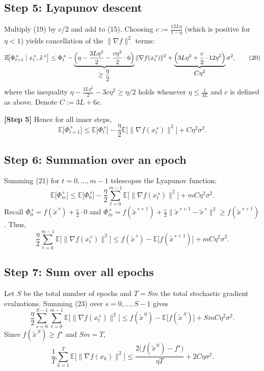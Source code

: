 \documentclass{article}
\newcommand{\EE}{\mathbb{E}}
\begin{document}
\subsection*{Step 5: Lyapunov descent}
Multiply (19) by $c/2$ and add to (15).  Choosing $c:=\frac{12L\eta}{1-\eta}$ (which is positive for $\eta<1$) yields cancellation of the $\|\nabla f\|^{2}$ terms:
\[
\EE\!\bigl[\Phi_{t+1}^{\,s}\mid x_{t}^{\,s},\tilde{x}^{\,s}\bigr]
\le \Phi_{t}^{\,s}
-\underbrace{\Bigl(\eta-\frac{3L\eta^{2}}{2}-\frac{c\eta^{2}}{2}\cdot6\Bigr)}_{\displaystyle\ge\frac{\eta}{2}}\|\nabla f(x_{t}^{\,s})\|^{2}
+ \underbrace{\Bigl(3L\eta^{2}+ \frac{c}{2}\cdot12\eta^{2}\Bigr)}_{\displaystyle C\eta^{2}}\sigma^{2},
\tag{20}
\]
where the inequality $\eta-\frac{3L\eta^{2}}{2}-3c\eta^{2}\ge \eta/2$ holds whenever $\eta\le \frac{1}{3L}$ and $c$ is defined as above.  Denote $C:=3L+6c$.

\textbf{[Step 5]} Hence for all inner steps,
\[
\EE\!\bigl[\Phi_{t+1}^{\,s}\bigr]\le \EE\!\bigl[\Phi_{t}^{\,s}\bigr]-\frac{\eta}{2}\EE\!\bigl[\|\nabla f(x_{t}^{\,s})\|^{2}\bigr]+C\eta^{2}\sigma^{2}.
\tag{21}
\]

\subsection*{Step 6: Summation over an epoch}
Summing (21) for $t=0,\dots,m-1$ telescopes the Lyapunov function:
\[
\EE\!\bigl[\Phi_{m}^{\,s}\bigr]\le \EE\!\bigl[\Phi_{0}^{\,s}\bigr]
-\frac{\eta}{2}\sum_{t=0}^{m-1}\EE\!\bigl[\|\nabla f(x_{t}^{\,s})\|^{2}\bigr]
+ mC\eta^{2}\sigma^{2}.
\tag{22}
\]
Recall $\Phi_{0}^{\,s}= f(\tilde{x}^{\,s})+\frac{c}{2}\cdot0$ and $\Phi_{m}^{\,s}= f(\tilde{x}^{\,s+1})+\frac{c}{2}\| \tilde{x}^{\,s+1}-\tilde{x}^{\,s}\|^{2}\ge f(\tilde{x}^{\,s+1})$.
Thus,
\[
\frac{\eta}{2}\sum_{t=0}^{m-1}\EE\!\bigl[\|\nabla f(x_{t}^{\,s})\|^{2}\bigr]
\le f(\tilde{x}^{\,s})- \EE\!\bigl[f(\tilde{x}^{\,s+1})\bigr] + mC\eta^{2}\sigma^{2}.
\tag{23}
\]

\subsection*{Step 7: Sum over all epochs}
Let $S$ be the total number of epochs and $T=Sm$ the total stochastic gradient evaluations.  Summing (23) over $s=0,\dots,S-1$ gives
\[
\frac{\eta}{2}\sum_{s=0}^{S-1}\sum_{t=0}^{m-1}\EE\!\bigl[\|\nabla f(x_{t}^{\,s})\|^{2}\bigr]
\le f(\tilde{x}^{\,0})- \EE\!\bigl[f(\tilde{x}^{\,S})\bigr] + SmC\eta^{2}\sigma^{2}.
\tag{24}
\]
Since $f(\tilde{x}^{\,S})\ge f^{\star}$ and $Sm=T$,
\[
\frac{1}{T}\sum_{k=1}^{T}\EE\!\bigl[\|\nabla f(x_{k})\|^{2}\bigr]
\le \frac{2\bigl(f(\tilde{x}^{\,0})-f^{\star}\bigr)}{\eta T}+2C\eta\sigma^{2}.
\tag{25}
\]
\end{document}
